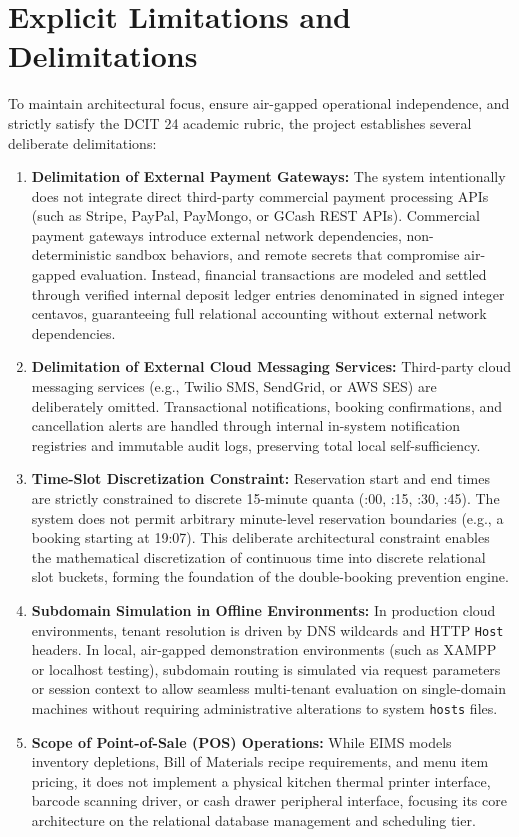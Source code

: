 \section{Explicit Limitations and Delimitations}
\label{sec:scope_limitations}
To maintain architectural focus, ensure air-gapped operational independence, and strictly satisfy the DCIT 24 academic rubric, the project establishes several deliberate delimitations:

\begin{enumerate}[label=\textbf{L\arabic*.}]
    \item \textbf{Delimitation of External Payment Gateways:} The system intentionally does not integrate direct third-party commercial payment processing APIs (such as Stripe, PayPal, PayMongo, or GCash REST APIs). Commercial payment gateways introduce external network dependencies, non-deterministic sandbox behaviors, and remote secrets that compromise air-gapped evaluation. Instead, financial transactions are modeled and settled through verified internal deposit ledger entries denominated in signed integer centavos, guaranteeing full relational accounting without external network dependencies.
    \item \textbf{Delimitation of External Cloud Messaging Services:} Third-party cloud messaging services (e.g., Twilio SMS, SendGrid, or AWS SES) are deliberately omitted. Transactional notifications, booking confirmations, and cancellation alerts are handled through internal in-system notification registries and immutable audit logs, preserving total local self-sufficiency.
    \item \textbf{Time-Slot Discretization Constraint:} Reservation start and end times are strictly constrained to discrete 15-minute quanta (:00, :15, :30, :45). The system does not permit arbitrary minute-level reservation boundaries (e.g., a booking starting at 19:07). This deliberate architectural constraint enables the mathematical discretization of continuous time into discrete relational slot buckets, forming the foundation of the double-booking prevention engine.
    \item \textbf{Subdomain Simulation in Offline Environments:} In production cloud environments, tenant resolution is driven by DNS wildcards and HTTP \texttt{Host} headers. In local, air-gapped demonstration environments (such as XAMPP or localhost testing), subdomain routing is simulated via request parameters or session context to allow seamless multi-tenant evaluation on single-domain machines without requiring administrative alterations to system \texttt{hosts} files.
    \item \textbf{Scope of Point-of-Sale (POS) Operations:} While EIMS models inventory depletions, Bill of Materials recipe requirements, and menu item pricing, it does not implement a physical kitchen thermal printer interface, barcode scanning driver, or cash drawer peripheral interface, focusing its core architecture on the relational database management and scheduling tier.
\end{enumerate}
